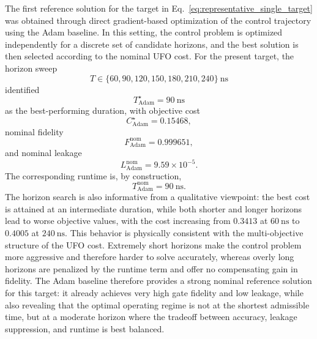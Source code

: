 
The first reference solution for the target in Eq.~\eqref{eq:representative_single_target} was obtained through direct gradient-based optimization of the control trajectory using the Adam baseline. In this setting, the control problem is optimized independently for a discrete set of candidate horizons, and the best solution is then selected according to the nominal UFO cost. For the present target, the horizon sweep
\begin{equation}
T \in \{60,90,120,150,180,210,240\}\ \mathrm{ns}
\label{eq:adam_horizon_grid}
\end{equation}
identified
\begin{equation}
T^{\star}_{\mathrm{Adam}} = 90~\mathrm{ns}
\label{eq:adam_best_horizon}
\end{equation}
as the best-performing duration, with objective cost
\begin{equation}
C_{\mathrm{Adam}}^{\star} = 0.15468,
\label{eq:adam_best_cost}
\end{equation}
nominal fidelity
\begin{equation}
F_{\mathrm{Adam}}^{\mathrm{nom}} = 0.999651,
\label{eq:adam_nominal_fidelity}
\end{equation}
and nominal leakage
\begin{equation}
L_{\mathrm{Adam}}^{\mathrm{nom}} = 9.59\times 10^{-5}.
\label{eq:adam_nominal_leakage}
\end{equation}
The corresponding runtime is, by construction,
\begin{equation}
T_{\mathrm{Adam}}^{\mathrm{nom}} = 90~\mathrm{ns}.
\label{eq:adam_nominal_runtime}
\end{equation}
The horizon search is also informative from a qualitative viewpoint: the best cost is attained at an intermediate duration, while both shorter and longer horizons lead to worse objective values, with the cost increasing from \(0.3413\) at \(60~\mathrm{ns}\) to \(0.4005\) at \(240~\mathrm{ns}\). This behavior is physically consistent with the multi-objective structure of the UFO cost. Extremely short horizons make the control problem more aggressive and therefore harder to solve accurately, whereas overly long horizons are penalized by the runtime term and offer no compensating gain in fidelity. The Adam baseline therefore provides a strong nominal reference solution for this target: it already achieves very high gate fidelity and low leakage, while also revealing that the optimal operating regime is not at the shortest admissible time, but at a moderate horizon where the tradeoff between accuracy, leakage suppression, and runtime is best balanced.





